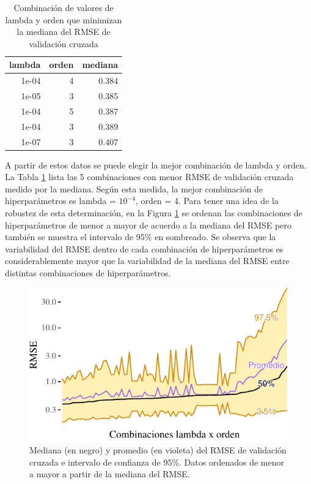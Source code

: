 \documentclass[]{tufte-handout}
\begin{document}
\begin{table}

\caption{\label{tab:rmse-mejores}Combinación de valores de lambda y orden que minimizan la mediana del RMSE de validación cruzada}
\centering
\begin{tabular}[t]{rrr}
\toprule
lambda & orden & mediana\\
\midrule
1e-04 & 4 & 0.384\\
1e-05 & 3 & 0.385\\
1e-04 & 5 & 0.387\\
1e-04 & 3 & 0.389\\
1e-07 & 3 & 0.407\\
\bottomrule
\end{tabular}
\end{table}

A partir de estos datos se puede elegir la mejor combinación de lambda y orden. La Tabla \ref{tab:rmse-mejores} lista las 5 combinaciones con menor RMSE de validación cruzada medido por la mediana. Según esta medida, la mejor combinación de hiperparámetros es lambda = \ensuremath{10^{-4}}, orden = 4. Para tener una idea de la robustez de esta determinación, en la Figura \ref{fig:rmse-orden} se ordenan las combinaciones de hiperparámetros de menor a mayor de acuerdo a la mediana del RMSE pero también se muestra el intervalo de 95\% en sombreado. Se observa que la variabilidad del RMSE dentro de cada combinación de hiperparámetros es considerablemente mayor que la variabilidad de la mediana del RMSE entre distintas combinaciones de hiperparámetros.

\begin{figure}
\includegraphics{TP-Labo-1_files/figure-latex/rmse-orden-1} \caption[Mediana (en negro) y promedio (en violeta) del RMSE de validación cruzada e intervalo de confianza de 95\%]{Mediana (en negro) y promedio (en violeta) del RMSE de validación cruzada e intervalo de confianza de 95\%. Datos ordenados de menor a mayor a partir de la mediana del RMSE.}\label{fig:rmse-orden}
\end{figure}
\end{document}
